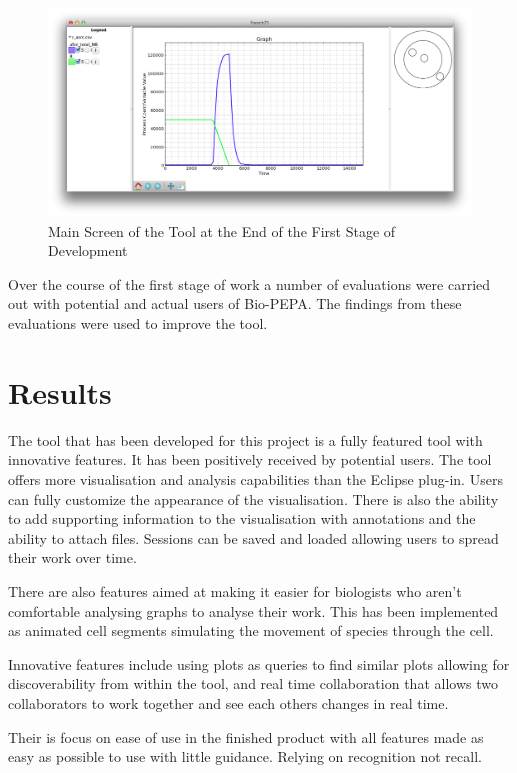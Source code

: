 \begin{figure}[h!]
    \centering
    \includegraphics[width=\textwidth]{images/french75_mac.png}
    \caption{Main Screen of the Tool at the End of the First Stage of Development}
    \label{fig:f75_mac_intro}
\end{figure}

Over the course of the first stage of work a number of evaluations were carried out with potential and actual users of Bio-PEPA.  The findings from these evaluations were used to improve the tool.

\section{Results}

The tool that has been developed for this project is a fully featured tool with innovative features.  It has been positively received by potential users.
The tool offers more visualisation and analysis capabilities than the Eclipse plug-in.  Users can fully customize the appearance of the visualisation.  There is also the ability to add supporting information to the visualisation with annotations and the ability to attach files.  Sessions can be saved and loaded allowing users to spread their work over time.

There are also features aimed at making it easier for biologists who aren't comfortable analysing graphs to analyse their work.  This has been implemented as animated cell segments simulating the movement of species through the cell.

Innovative features include using plots as queries to find similar plots allowing for discoverability from within the tool, and real time collaboration that allows two collaborators to work together and see each others changes in real time.

Their is focus on ease of use in the finished product with all features made as easy as possible to use with little guidance.  Relying on recognition not recall.

